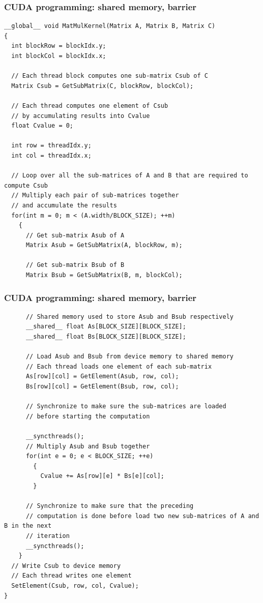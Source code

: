 \begin{frame}[fragile]
  \frametitle{CUDA programming: shared memory, barrier}
{\tiny
{\color{mycolorcode}
\begin{verbatim}
__global__ void MatMulKernel(Matrix A, Matrix B, Matrix C)
{
  int blockRow = blockIdx.y;
  int blockCol = blockIdx.x;

  // Each thread block computes one sub-matrix Csub of C
  Matrix Csub = GetSubMatrix(C, blockRow, blockCol);

  // Each thread computes one element of Csub
  // by accumulating results into Cvalue
  float Cvalue = 0;

  int row = threadIdx.y;
  int col = threadIdx.x;

  // Loop over all the sub-matrices of A and B that are required to compute Csub
  // Multiply each pair of sub-matrices together
  // and accumulate the results
  for(int m = 0; m < (A.width/BLOCK_SIZE); ++m)
    {
      // Get sub-matrix Asub of A
      Matrix Asub = GetSubMatrix(A, blockRow, m);
      
      // Get sub-matrix Bsub of B
      Matrix Bsub = GetSubMatrix(B, m, blockCol);
\end{verbatim}
}
}
\end{frame}


\begin{frame}[fragile]
  \frametitle{CUDA programming: shared memory, barrier}
{\tiny
{\color{mycolorcode}
\begin{verbatim}
      // Shared memory used to store Asub and Bsub respectively
      __shared__ float As[BLOCK_SIZE][BLOCK_SIZE];
      __shared__ float Bs[BLOCK_SIZE][BLOCK_SIZE];

      // Load Asub and Bsub from device memory to shared memory
      // Each thread loads one element of each sub-matrix
      As[row][col] = GetElement(Asub, row, col);
      Bs[row][col] = GetElement(Bsub, row, col);

      // Synchronize to make sure the sub-matrices are loaded
      // before starting the computation

      __syncthreads();
      // Multiply Asub and Bsub together
      for(int e = 0; e < BLOCK_SIZE; ++e)
        {
          Cvalue += As[row][e] * Bs[e][col];
        }

      // Synchronize to make sure that the preceding
      // computation is done before load two new sub-matrices of A and B in the next
      // iteration
      __syncthreads();
    }
  // Write Csub to device memory
  // Each thread writes one element
  SetElement(Csub, row, col, Cvalue);
}

\end{verbatim}
}
}
\end{frame}



